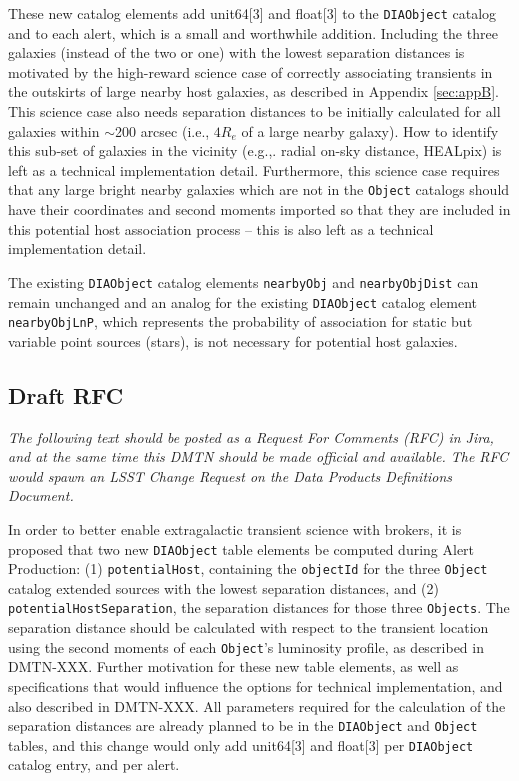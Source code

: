 \documentclass[DM,authoryear,toc]{lsstdoc}
\begin{document}
These new catalog elements add unit64[3] and float[3] to the {\tt DIAObject} catalog and to each alert, which is a small and worthwhile addition.
Including the three galaxies (instead of the two or one) with the lowest separation distances is motivated by the high-reward science case of correctly associating transients in the outskirts of large nearby host galaxies, as described in Appendix \ref{sec:appB}. 
This science case also needs separation distances to be initially calculated for all galaxies within $\sim$200 arcsec (i.e., $4R_e$ of a large nearby galaxy).
How to identify this sub-set of galaxies in the vicinity (e.g.,. radial on-sky distance, HEALpix) is left as a technical implementation detail.
Furthermore, this science case requires that any large bright nearby galaxies which are not in the {\tt Object} catalogs should have their coordinates and second moments imported so that they are included in this potential host association process -- this is also left as a technical implementation detail.

The existing {\tt DIAObject} catalog elements {\tt nearbyObj} and {\tt nearbyObjDist} can remain unchanged and an analog for the existing {\tt DIAObject} catalog element {\tt nearbyObjLnP}, which represents the probability of association for static but variable point sources (stars), is not necessary for potential host galaxies.


\subsection{Draft RFC}\label{ssec:draft_rfc}

\textit{The following text should be posted as a Request For Comments (RFC) in Jira, and at the same time this DMTN should be made official and available. The RFC would spawn an LSST Change Request on the Data Products Definitions Document.}

In order to better enable extragalactic transient science with brokers, it is proposed that two new {\tt DIAObject} table elements be computed during Alert Production:
(1) {\tt potentialHost}, containing the {\tt objectId} for the three {\tt Object} catalog extended sources with the lowest separation distances, and
(2) {\tt potentialHostSeparation}, the separation distances for those three {\tt Objects}.
The separation distance should be calculated with respect to the transient location using the second moments of each {\tt Object}'s luminosity profile, as described in DMTN-XXX.
Further motivation for these new table elements, as well as specifications that would influence the options for technical implementation, and also described in DMTN-XXX.
All parameters required for the calculation of the separation distances are already planned to be in the {\tt DIAObject} and {\tt Object} tables, and this change would only add unit64[3] and float[3] per {\tt DIAObject} catalog entry, and per alert.
\end{document}
